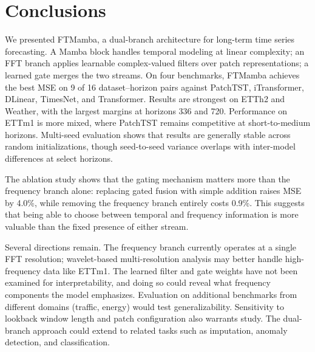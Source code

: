 \documentclass[symmetry,article,submit,pdftex,moreauthors]{Definitions/mdpi}
\begin{document}
\section{Conclusions}

We presented FTMamba, a dual-branch architecture for long-term time series forecasting. A Mamba block handles temporal modeling at linear complexity; an FFT branch applies learnable complex-valued filters over patch representations; a learned gate merges the two streams. On four benchmarks, FTMamba achieves the best MSE on 9 of 16 dataset--horizon pairs against PatchTST, iTransformer, DLinear, TimesNet, and Transformer. Results are strongest on ETTh2 and Weather, with the largest margins at horizons 336 and 720. Performance on ETTm1 is more mixed, where PatchTST remains competitive at short-to-medium horizons. Multi-seed evaluation shows that results are generally stable across random initializations, though seed-to-seed variance overlaps with inter-model differences at select horizons.

The ablation study shows that the gating mechanism matters more than the frequency branch alone: replacing gated fusion with simple addition raises MSE by 4.0\%, while removing the frequency branch entirely costs 0.9\%. This suggests that being able to choose between temporal and frequency information is more valuable than the fixed presence of either stream.

Several directions remain. The frequency branch currently operates at a single FFT resolution; wavelet-based multi-resolution analysis may better handle high-frequency data like ETTm1. The learned filter and gate weights have not been examined for interpretability, and doing so could reveal what frequency components the model emphasizes. Evaluation on additional benchmarks from different domains (traffic, energy) would test generalizability. Sensitivity to lookback window length and patch configuration also warrants study. The dual-branch approach could extend to related tasks such as imputation, anomaly detection, and classification.

\vspace{6pt}

\end{document}
